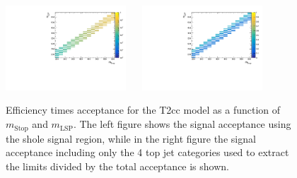 \begin{figure}[h!]
  \begin{center}
    \includegraphics[width=0.4\textwidth]{figures/jetRanking/T2cc/eff/T2cc_merging_9_cats.pdf} ~~
    \includegraphics[width=0.4\textwidth]{figures/susyResults/T2cc_doubleRatioAcceptance.pdf} \\
    \caption{
      Efficiency times acceptance for the T2cc model as a function of $m_{\mathrm{Stop}}$ and $m_{\mathrm{LSP}}$.
      The left figure shows the signal acceptance using the shole signal region, 
      while in the right figure the signal acceptance including only the 4 top jet categories used to extract the limits divided by the total acceptance is shown.
    }
    \label{fig:sig-eff-T2cc}
  \end{center}
\end{figure}

